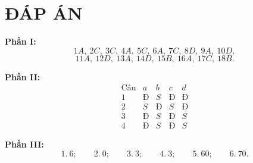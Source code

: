 
\section*{ĐÁP ÁN}

\textbf{Phần I:}
\[
1A,\ 2C,\ 3C,\ 4A,\ 5C,\ 6A,\ 7C,\ 8D,\ 9A,\ 10D,
\]
\[
11A,\ 12D,\ 13A,\ 14D,\ 15B,\ 16A,\ 17C,\ 18B.
\]

\textbf{Phần II:}
\[
\begin{array}{c|cccc}
\text{Câu} & a & b & c & d\\ \hline
1 & Đ & S & Đ & Đ\\
2 & S & Đ & S & Đ\\
3 & Đ & S & Đ & S\\
4 & Đ & S & Đ & S
\end{array}
\]

\textbf{Phần III:}
\[
1.\ 6;\qquad
2.\ 0;\qquad
3.\ 3;\qquad
4.\ 3;\qquad
5.\ 60;\qquad
6.\ 70.
\]

